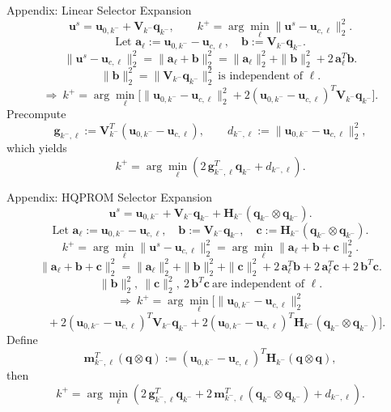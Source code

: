 \documentclass{beamer}
\begin{document}
\begin{frame}{Appendix: Linear Selector Expansion}
\scriptsize
\[
\mathbf u^s=\mathbf u_{0,k^-}+\mathbf V_{k^-}\mathbf q_{k^-},
\qquad
k^+=\arg\min_{\ell}\|\mathbf u^s-\mathbf u_{c,\ell}\|_2^2.
\]
\[
\text{Let }\mathbf a_\ell:=\mathbf u_{0,k^-}-\mathbf u_{c,\ell},\quad
\mathbf b:=\mathbf V_{k^-}\mathbf q_{k^-}.
\]
\[
\|\mathbf u^s-\mathbf u_{c,\ell}\|_2^2
=\|\mathbf a_\ell+\mathbf b\|_2^2
=\|\mathbf a_\ell\|_2^2+\|\mathbf b\|_2^2+2\,\mathbf a_\ell^T\mathbf b.
\]
\[
\|\mathbf b\|_2^2=\|\mathbf V_{k^-}\mathbf q_{k^-}\|_2^2
\ \text{is independent of }\ell.
\]
\[
\Rightarrow\
k^+=\arg\min_{\ell}
\Big[
\|\mathbf u_{0,k^-}-\mathbf u_{c,\ell}\|_2^2
+2(\mathbf u_{0,k^-}-\mathbf u_{c,\ell})^T\mathbf V_{k^-}\mathbf q_{k^-}
\Big].
\]
Precompute
\[
\mathbf g_{k^-,\ell}:=\mathbf V_{k^-}^T(\mathbf u_{0,k^-}-\mathbf u_{c,\ell}),
\qquad
d_{k^-,\ell}:=\|\mathbf u_{0,k^-}-\mathbf u_{c,\ell}\|_2^2,
\]
which yields
\[
k^+=\arg\min_{\ell}\left(2\,\mathbf g_{k^-,\ell}^T\mathbf q_{k^-}+d_{k^-,\ell}\right).
\]
\end{frame}

\begin{frame}{Appendix: HQPROM Selector Expansion}
\scriptsize
\[
\mathbf u^s=\mathbf u_{0,k^-}+\mathbf V_{k^-}\mathbf q_{k^-}
+\mathbf H_{k^-}(\mathbf q_{k^-}\otimes\mathbf q_{k^-}).
\]
\[
\text{Let }\mathbf a_\ell:=\mathbf u_{0,k^-}-\mathbf u_{c,\ell},\quad
\mathbf b:=\mathbf V_{k^-}\mathbf q_{k^-},\quad
\mathbf c:=\mathbf H_{k^-}(\mathbf q_{k^-}\otimes\mathbf q_{k^-}).
\]
\[
k^+=\arg\min_{\ell}\|\mathbf u^s-\mathbf u_{c,\ell}\|_2^2
=
\arg\min_{\ell}
\|\mathbf a_\ell+\mathbf b+\mathbf c\|_2^2.
\]
\[
\|\mathbf a_\ell+\mathbf b+\mathbf c\|_2^2
=\|\mathbf a_\ell\|_2^2+\|\mathbf b\|_2^2+\|\mathbf c\|_2^2
+2\,\mathbf a_\ell^T\mathbf b
+2\,\mathbf a_\ell^T\mathbf c
+2\,\mathbf b^T\mathbf c.
\]
\[
\|\mathbf b\|_2^2,\ \|\mathbf c\|_2^2,\ 2\,\mathbf b^T\mathbf c
\ \text{are independent of }\ell.
\]
\[
\Rightarrow\
k^+=\arg\min_{\ell}
\Big[
\|\mathbf u_{0,k^-}-\mathbf u_{c,\ell}\|_2^2
\]
\[
\quad
+2(\mathbf u_{0,k^-}-\mathbf u_{c,\ell})^T\mathbf V_{k^-}\mathbf q_{k^-}
+2(\mathbf u_{0,k^-}-\mathbf u_{c,\ell})^T\mathbf H_{k^-}(\mathbf q_{k^-}\otimes\mathbf q_{k^-})
\Big].
\]
Define
\[
\mathbf m_{k^-,\ell}^T(\mathbf q\otimes\mathbf q)
:=
(\mathbf u_{0,k^-}-\mathbf u_{c,\ell})^T\mathbf H_{k^-}(\mathbf q\otimes\mathbf q),
\]
then
\[
k^+=\arg\min_{\ell}
\left(
2\,\mathbf g_{k^-,\ell}^T\mathbf q_{k^-}
+2\,\mathbf m_{k^-,\ell}^T(\mathbf q_{k^-}\otimes\mathbf q_{k^-})
+d_{k^-,\ell}
\right).
\]
\end{frame}
\end{document}
